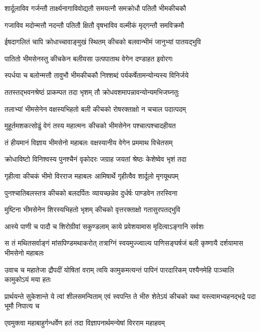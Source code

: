\twolineshloka
{शार्दूलाविव गर्जन्तौ तार्क्ष्यनागाविवोद्यतौ}
{समयत्नौ समक्रोधौ पतितौ भीमकीचकौ}


\twolineshloka
{गजाविव मदोन्मत्तौ नदन्तौ पतितौ क्षितौ}
{वृषभाविव वल्मीकं मृद्गन्तौ समविक्रमौ}


\twolineshloka
{ईषदागलितं चापि क्रोधाच्चावाङ्मुखं स्थितम्}
{कीचको बलवान्भीमं जानुभ्यां पातयद्भुवि}


\twolineshloka
{पातितो भीमसेनस्तु कीचकेन बलीयसा}
{उत्पपाताथ वेगेन दण्डाहत इवोरगः}


\twolineshloka
{स्पर्धया च बलोन्मत्तौ तावुभौ भीमकीचकौ}
{निश्शब्दं पर्यकर्षेतामन्योन्यस्य विनिर्जये}


\twolineshloka
{ततस्तद्भवनश्रेष्ठं प्राकम्पत तदा भृशम्}
{तौ क्रोधवशमापन्नावन्योन्यमभिजघ्नतुः}


\twolineshloka
{तलाभ्यां भीमसेनेन वक्षस्यभिहतो बली}
{कीचको रोषरक्ताक्षो न चचाल पदात्पदम्}


\twolineshloka
{मुहूर्तमशकत्सोढुं वेगं तस्य महात्मनः}
{कीचको भीमसेनेन पश्चात्पश्चादहीयत}


\twolineshloka
{तं हीयमानं विज्ञाय भीमसेनो महाबलः}
{वक्षस्यानीय वेगेन प्रममाथ विचेतसम्}


\twolineshloka
{क्रोधाविष्टो विनिश्वस्य पुनश्चैनं वृकोदरः}
{जग्राह जयतां श्रेष्ठः केशेष्वेव भृशं तदा}


\twolineshloka
{गृहीत्वा कीचकं भीमो विरराज महाबलः}
{आमिषार्थे गृहीत्वैव शार्दूलो मृगयूथपम्}


\twolineshloka
{पुनश्चातिबलस्तत्र कीचको बलदर्पितः}
{व्यायच्छन्नेव दुर्धर्षः पाण्डवेन तरस्विना}


\twolineshloka
{मुष्टिना भीमसेनेन शिरस्यभिहतो भृशम्}
{कीचको वृत्तरक्ताक्षो गतासुरपतद्भुवि}


\twolineshloka
{आस्ये पाणी च पादौ च शिरोग्रीवां सकुण्डलाम्}
{काये प्रवेशयामास मृदित्वाऽङ्गानि सर्वशः}


\onelineshloka
{स तं मथितसर्वाङ्गं मांसपिण्डमथाकरोत्}
\twolineshloka
{तत्राग्निं स्वयमुज्ज्वाल्य पाणिसङ्घर्षजं बली}
{कृष्णायै दर्शयामास भीमसेनो महाबलः}


\threelineshloka
{उवाच च महातेजा द्रौपदीं योषितां वराम्}
{त्वयि कामुकमत्यन्तं पापिनं पारदारिकम्}
{पश्यैनमेहि पाञ्चालि कामुकोऽयं मया हतः}


\threelineshloka
{प्रार्थयन्ते सुकेशान्ते ये त्वां शीलसमन्विताम्}
{एवं स्वपन्ति ते भीरु शेतेऽयं कीचको यथा}
{यस्त्वामभ्यहनद्भद्रे पदा भूमौ निपात्य च}


\twolineshloka
{एवमुक्त्वा महाबाहुर्गन्धर्वेण हतं तदा}
{विज्ञापनार्थमन्येषां विरराम महाहवम्}


